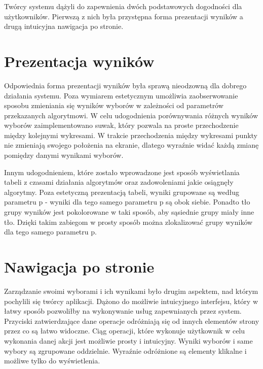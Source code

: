 \documentclass[pdflatex,11pt]{../aghdoc_version2}
\newlength\tindent
\renewcommand{\indent}{\hspace*{\tindent}}
\begin{document}
Twórcy systemu dążyli do zapewnienia dwóch podstawowych dogodności dla użytkowników. Pierwszą z nich była przystępna forma prezentacji wyników a drugą intuicyjna nawigacja po stronie.

\section{Prezentacja wyników}
Odpowiednia forma prezentacji wyników była sprawą nieodzowną dla dobrego działania systemu. Poza wymiarem estetycznym umożliwia zaobserwowanie sposobu zmieniania się wyników wyborów w zależności od parametrów przekazanych algorytmowi. W celu udogodnienia porównywania różnych wyników wyborów zaimplementowano suwak, który pozwala na proste przechodzenie między kolejnymi wykresami. W trakcie przechodzenia między wykresami punkty nie zmieniają swojego położenia na ekranie, dlatego wyraźnie widać każdą zmianę pomiędzy danymi wynikami wyborów.
 
\indent Innym udogodnieniem, które zostało wprowadzone jest sposób wyświetlania tabeli z czasami działania algorytmów oraz zadowoleniami jakie osiągnęły algorytmy. Poza estetyczną prezentacją tabeli, wyniki grupowane są według parametru p - wyniki dla tego samego parametru p są obok siebie. Ponadto tło grupy wyników jest pokolorowane w taki sposób, aby sąsiednie grupy miały inne tło. Dzięki takim zabiegom w prosty sposób można zlokalizować grupy wyników dla tego samego parametru p.

\section{Nawigacja po stronie}

Zarządzanie swoimi wyborami i ich wynikami było drugim aspektem, nad którym pochylili się twórcy aplikacji. Dążono do możliwie intuicyjnego interfejsu, który w łatwy sposób pozwoliłby na wykonywanie usług zapewnianych przez system. Przyciski zatwierdzające dane operacje odróżniają się od innych elementów strony przez co są łatwo widoczne. Ciąg operacji, które wykonuje użytkownik w celu wykonania danej akcji jest możliwie prosty i intuicyjny. Wyniki wyborów i same wybory są zgrupowane oddzielnie. Wyraźnie odróżnione są elementy klikalne i możliwe tylko do wyświetlenia.

\newpage
\cleardoublepage
{}
\listoffigures




\end{document}
